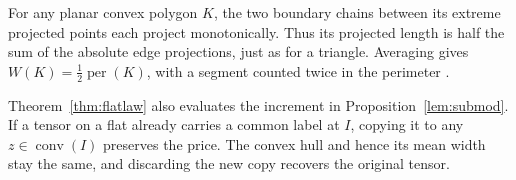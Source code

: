 For any planar convex polygon $K$, the two boundary chains between its
extreme projected points each project monotonically. Thus its projected
length is half the sum of the absolute edge projections, just as for a
triangle. Averaging gives $W(K)=\tfrac12\operatorname{per}(K)$, with
a segment counted twice in the perimeter \cite{Schneider}.

Theorem~\ref{thm:flatlaw} also evaluates the increment in
Proposition~\ref{lem:submod}. If a tensor on a flat already carries a
common label at $I$, copying it to any $z\in\operatorname{conv}(I)$
preserves the price. The convex hull and hence its mean width stay the
same, and discarding the new copy recovers the original tensor.
